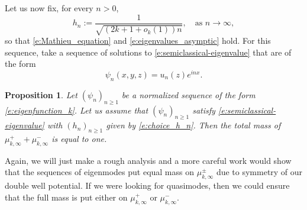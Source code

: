 \documentclass[JEP,XML,SOM,Unicode, NoEqCountersInSection,published]{cedram}
\theoremstyle{plain}
\newtheorem{prop}[theo]{Proposition}
\theoremstyle{definition}
\theoremstyle{remark}
\begin{document}
Let us now fix, for every $n>0$,
\begin{equation}
\label{e:choice_h_n}
h_n := \frac{1}{\sqrt{(2k+1 + o_k(1)) n }}, \quad \text{as } n \to \infty,
\end{equation}
so that \eqref{e:Mathieu_equation} and \eqref{e:eigenvalues_asymptic} hold. For this sequence, take a sequence of solutions to \eqref{e:semiclassical-eigenvalue} that are of the form
\begin{equation}
\label{e:eigenfunction_k}
\psi_n(x,y,z) = u_{n}(z)e^{inx}.
\end{equation}

\begin{prop}
\label{p:examples_sequences}
Let $(\psi_n)_{n\geq 1}$ be a normalized sequence of the form \eqref{e:eigenfunction_k}. Let us assume that $(\psi_n)_{n\geq 1}$ satisfy \eqref{e:semiclassical-eigenvalue} with $(h_n)_{n\geq 1}$ given by \eqref{e:choice_h_n}. Then the total mass of $\mu^+_{k,\infty} + \mu^-_{k,\infty}$ is equal to one.
\end{prop}

Again, we will just make a rough analysis and a more careful work would show that the sequences of eigenmodes put equal mass on $\mu_{k,\infty}^\pm$ due to symmetry of our double well potential. If we were looking for quasimodes, then we could ensure that the full mass is put either on $\mu_{k,\infty}^+$ or $\mu_{k,\infty}^-$.
\end{document}
